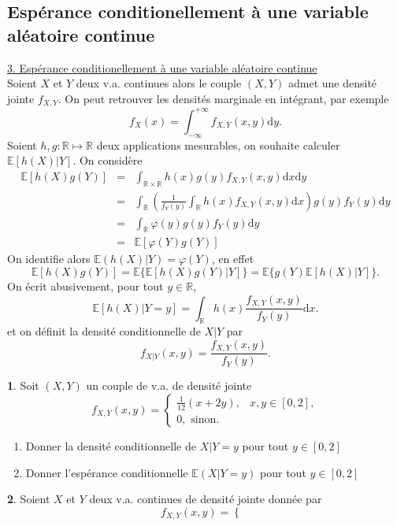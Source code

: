 \documentclass[8pt,notheorems]{beamer}
\def \E{\mathbb E}
\theoremstyle{definition}
\theoremstyle{example}
\newtheorem{example}{\translate{Exemple}}
\theoremstyle{mystyle}
\theoremstyle{plain}
\begin{document}
\subsection{Espérance conditionellement à une variable aléatoire continue}
\begin{frame}[allowframebreaks]
\underline{3. Espérance conditionellement à une variable aléatoire continue}\\
Soient $X$ et $Y$ deux v.a. continues alors le couple $(X,Y)$ admet une densité jointe $f_{X,Y}$. On peut retrouver les densités marginale en intégrant, par exemple 
$$
f_X(x) = \int_{-\infty}^{+\infty}f_{X,Y}(x,y)\text{d}y. 
$$
Soient $h,g:\mathbb{R}\mapsto \mathbb{R}$ deux applications mesurables, on souhaite calculer $\E[h(X)|Y]$. On considère 
\begin{eqnarray*}
\E[h(X)g(Y)] &=& \int_{\mathbb{R}\times \mathbb{R}}h(x)g(y)f_{X,Y}(x,y)\text{d}x\text{d}y\\
&=& \int_{\mathbb{R}}\left(\frac{1}{f_Y(y)}\int_{\mathbb{R}}h(x)f_{X,Y}(x,y)\text{d}x\right) g(y)f_Y(y)\text{d}y\\
&=&\int_{\mathbb{R}}\varphi(y) g(y)f_Y(y)\text{d}y\\
&=&\E[\varphi(Y)g(Y)]
\end{eqnarray*}
On identifie alors $\E(h(X)|Y) = \varphi(Y)$, en effet
$$
\E[h(X)g(Y)] = \E\{\E[h(X)g(Y)|Y]\} = \E\{g(Y)\E[h(X)|Y]\}.
$$
On écrit abusivement, pour tout $y\in\mathbb{R}$,
$$
\E[h(X)|Y=y] =  \int_{\mathbb{R}}h(x)\frac{f_{X,Y}(x,y)}{f_Y(y)}\text{d}x.
$$
et on définit la densité conditionnelle de $X|Y$ par 
$$
f_{X|Y}(x,y)=\frac{f_{X,Y}(x,y)}{f_Y(y)}.
$$
\begin{example}
Soit $(X,Y)$ un couple de v.a. de densité jointe 
$$
f_{X,Y}(x,y) = \begin{cases}
\frac{1}{12}(x+2y),&x,y\in[0,2],\\
0,\text{ sinon.}
\end{cases}
$$
\begin{enumerate}
    \item Donner la densité conditionnelle de $X|Y=y$ pour tout $y\in [0,2]$
    \item Donner l'espérance conditionnelle $\E(X|Y = y)$ pour tout $y\in[0,2]$
\end{enumerate}
\end{example}
\begin{example}
Soient $X$ et $Y$ deux v.a. continues de densité jointe donnée par
\begin{equation*}
f_{X,Y}(x,y)=
\begin{cases}

\end{cases}
\end{equation*}
\end{example}
\end{frame}
\end{document}
